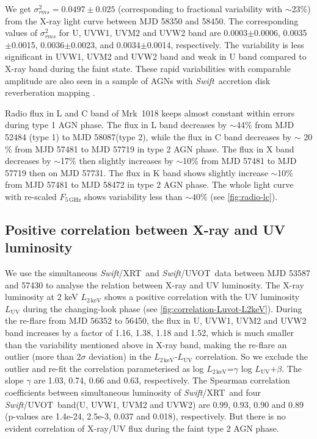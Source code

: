 \documentclass[twocolumn]{aastex63}
\newcommand{\swift}{{\small \it Swift}}
\newcommand{\xrt}{{\small {\it Swift}/XRT}}
\newcommand{\uvot}{{\small {\it Swift}/UVOT}}
\begin{document}
We get $\sigma^2_{rms} = 0.0497 \pm 0.025 $ (corresponding to fractional variability with $\sim$23\%) from the X-ray light curve between MJD 58350 and 58450. The corresponding values of $\sigma^2_{rms}$ for U, UVW1, UVM2 and UVW2 band are 0.0003$\pm$0.0006, 0.0035$\pm$0.0015, 0.0036$\pm$0.0023, and 0.0034$\pm$0.0014, respectively. The variability is less significant in UVW1, UVM2 and UVW2 band and weak in U band compared to X-ray band during the faint state. These rapid variabilities with comparable amplitude are also seen in a sample of AGNs with \swift \, accretion disk reverberation mapping \citep[see ][]{2019ApJ...870..123E}.

Radio flux in L and C band of Mrk~1018 keeps almost constant within errors during type 1 AGN phase. The flux in L band decreases by $\sim$44\% from MJD 52484 (type 1) to MJD 58087(type 2), while the flux in C band decreases by $\sim$ 20 \% from MJD 57481 to MJD 57719 in type 2 AGN phase. The flux in X band decreases by $\sim$17\% then slightly increases by $\sim$10\% from MJD 57481 to MJD 57719 then on MJD 57731. The flux in K band shows slightly increase $\sim$10\% from MJD 57481 to MJD 58472 in type 2 AGN phase. The whole light curve with re-scaled $F_\mathrm{5\,GHz}$ shows variability less than $\sim$40\% (see \autoref{fig:radio-lc}). 




\subsection{Positive correlation between X-ray and UV luminosity}
\label{subsec:xray-uv}
We use the simultaneous \xrt\, and \uvot\, data between MJD 53587 and 57430 to analyse the relation between X-ray and UV luminosity. The X-ray luminosity at 2 keV $L_\mathrm{{2\,keV}}$ shows a positive correlation with the UV luminosity $L_\mathrm{{UV}}$ during the changing-look phase (see \autoref{fig:correlation-Luvot-L2keV}). During the re-flare from MJD 56352 to 56450, the flux in U, UVW1, UVM2 and UVW2 band increases by a factor of 1.16, 1.38, 1.18 and 1.52, which is much smaller than the variability mentioned above in X-ray band, making the re-flare an outlier (more than 2$\sigma$ deviation) in the $L_\mathrm{{2\,keV}}$-$L_\mathrm{{UV}}$ correlation. So we exclude the outlier and re-fit the correlation parameterised as log $ L_\mathrm{{2\,keV}}$=$\gamma$ log $ L_\mathrm{{UV}}$+$\beta$. The slope $\gamma$ are 1.03, 0.74, 0.66 and 0.63, respectively. The Spearman correlation coefficients between simultaneous luminosity of \xrt\, and four \uvot\, band(U, UVW1, UVM2 and UVW2) are 0.99, 0.93, 0.90 and 0.89 (p-values are 1.4e-24, 2.5e-3, 0.037 and 0.018), respectively. But there is no evident correlation of X-ray/UV flux during the faint type 2 AGN phase.
\end{document}
